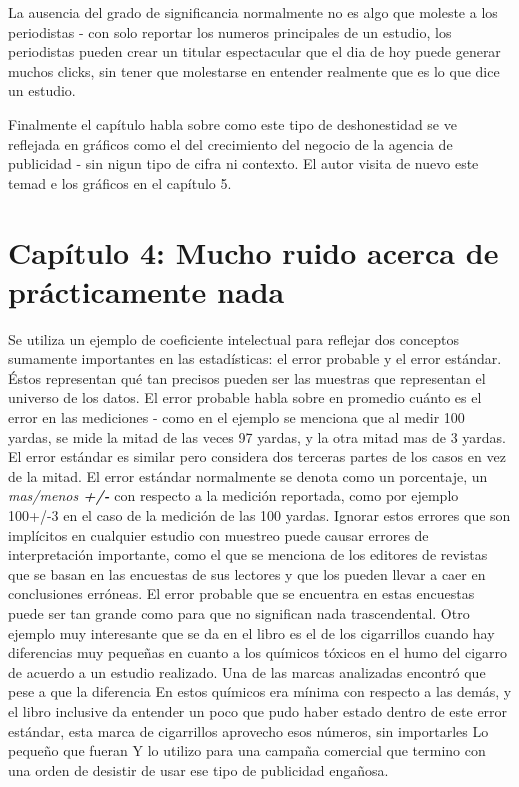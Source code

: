 \documentclass[a4paper, 11pt]{article}
\begin{document}
La ausencia del grado de significancia normalmente no es algo que moleste a los periodistas - con solo reportar los numeros principales de un estudio, los periodistas pueden crear un titular espectacular que el dia de hoy puede generar muchos clicks, sin tener que molestarse en entender realmente que es lo que dice un estudio. 

Finalmente el capítulo habla sobre como este tipo de deshonestidad se ve reflejada en gráficos como el del crecimiento del negocio de la agencia de publicidad - sin nigun tipo de cifra ni contexto. El autor visita de nuevo este temad e los gráficos en el capítulo 5.


\section*{Capítulo 4: Mucho ruido acerca de prácticamente nada}

Se utiliza un ejemplo de coeficiente intelectual para reflejar dos conceptos sumamente importantes en las estadísticas: el error probable y el error estándar. Éstos representan qué tan precisos pueden ser las muestras que representan el universo de los datos. El error probable habla sobre en promedio cuánto es el error en las mediciones - como en el ejemplo se menciona que al medir 100 yardas, se mide la mitad de las veces 97 yardas, y la otra mitad mas de 3 yardas. El error estándar es similar pero considera dos terceras partes de los casos en vez de la mitad.
El error estándar normalmente se denota como un porcentaje, un \textit{mas/menos \textbf{+/-}} con respecto a la medición reportada, como por ejemplo 100+/-3 en el caso de la medición de las 100 yardas.
Ignorar estos errores que son implícitos en cualquier estudio con muestreo puede causar errores de interpretación importante, como el que se menciona de los editores de revistas que se basan en las encuestas de sus lectores y que los pueden llevar a caer en conclusiones erróneas. El error probable que se encuentra en estas encuestas puede ser tan grande como para que no significan nada trascendental.
Otro ejemplo muy interesante que se da en el libro es el de los cigarrillos cuando hay diferencias muy pequeñas en cuanto a los químicos tóxicos en el humo del cigarro de acuerdo a un estudio realizado. Una de las marcas analizadas encontró que pese a que la diferencia En estos químicos era mínima con respecto a las demás, y el libro inclusive da entender un poco que pudo haber estado dentro de este error estándar, esta marca de cigarrillos aprovecho esos números, sin importarles Lo pequeño que fueran Y lo utilizo para una campaña comercial que termino con una orden de desistir de usar ese tipo de publicidad engañosa.
\end{document}
